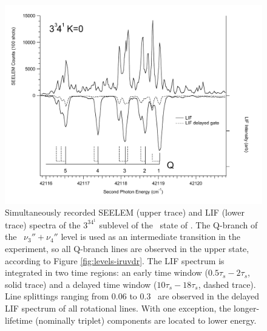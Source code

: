 \documentclass[12pt]{mitthesis}
\begin{document}

\begin{figure}
  \caption{Simultaneously recorded SEELEM (upper trace) and LIF (lower
    trace) spectra of the $3^34^1$  sublevel of the \astate\
    state of .  The Q-branch of the \xstate\ $\nu_3'' +
    \nu_4''$ level is used as an intermediate transition in the
    experiment, so all Q-branch lines are observed in the upper state,
    according to Figure \ref{fig:levels-iruvdr}.  The LIF spectrum is
    integrated in two time regions: an early time window
    ($0.5\tau_s-2\tau_s$, solid trace) and a delayed time window
    ($10\tau_s-18\tau_s$, dashed trace).  Line splittings ranging from
    0.06 to 0.3 \rcm\ are observed in the delayed LIF spectrum of all
    rotational lines.  With one exception, the longer-lifetime
    (nominally triplet) components are located to lower energy.}
  \label{fig:survey-3341}
  \centering
  \includegraphics[width=7in,angle=90]{spectrum-3341-q5q1-split.pdf}
\end{figure}
\end{document}
